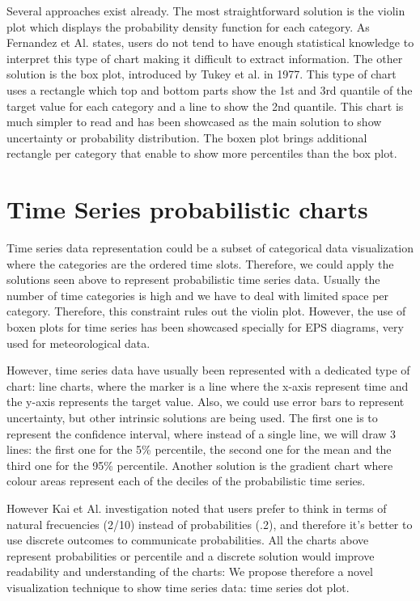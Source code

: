 \documentclass[a4paper,3p,sort&compress]{elsarticle}
\begin{document}
Several approaches exist already. The most straightforward solution is the violin plot which displays the probability density function for each category. As Fernandez et Al. states, users do not tend to have enough statistical knowledge to interpret this type of chart making it difficult to extract information. The other solution is the box plot, introduced by Tukey et al. in 1977. This type of chart uses a rectangle which top and bottom parts show the 1st and 3rd quantile of the target value for each category and a line to show the 2nd quantile. This chart is much simpler to read and has been showcased as the main solution to show uncertainty or probability distribution. The boxen plot brings additional rectangle per category that enable to show more percentiles than the box plot.

\section{Time Series probabilistic charts}
\label{sec:time_series}

Time series data representation could be a subset of categorical data visualization where the categories are the ordered time slots. Therefore, we could apply the solutions seen above to represent probabilistic time series data. Usually the number of time categories
is high and we have to deal with limited space per category. Therefore, this constraint rules out the violin plot. However, the use of boxen plots for time series has been showcased specially for EPS diagrams, very used for meteorological data.

However, time series data have usually been represented with a dedicated type of chart: line charts, where the marker is a 
line where the x-axis represent time and the y-axis represents the target value. Also, we could use error bars to represent uncertainty,
but other intrinsic solutions are being used. The first one is to represent the confidence interval, where instead of a single line, we 
will draw 3 lines: the first one for the 5\% percentile, the second one for the mean and the third one for the 95\% percentile. 
Another solution is the gradient chart where colour areas represent each of the deciles of the probabilistic time series.

However Kai et Al. investigation noted that users prefer to think in terms of natural frecuencies (2/10) instead 
of probabilities (.2), and therefore it's better to use discrete outcomes to communicate probabilities. All the charts above 
represent probabilities or percentile and a discrete solution would improve readability and understanding of the charts: We
propose therefore a novel visualization technique to show time series data: time series dot plot. 
\end{document}
